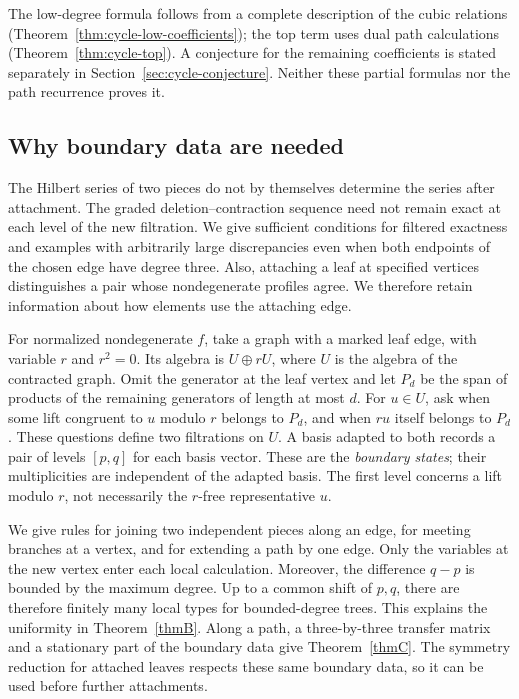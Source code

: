 \documentclass[reqno]{article}
\theoremstyle{plain} %
\theoremstyle{definition}
\theoremstyle{remark}
\numberwithin{equation}{section}
\begin{document}
The low-degree formula follows from a complete description of the cubic
relations (Theorem~\ref{thm:cycle-low-coefficients}); the top term uses
dual path calculations (Theorem~\ref{thm:cycle-top}). A conjecture for
the remaining coefficients is stated separately in
Section~\ref{sec:cycle-conjecture}. Neither these partial formulas nor
the path recurrence proves it.

\subsection{Why boundary data are needed}

The Hilbert series of two pieces do not by themselves determine the
series after attachment. The graded deletion--contraction sequence need
not remain exact at each level of the new filtration. We give sufficient
conditions for filtered exactness and examples with arbitrarily large
discrepancies even when both endpoints of the chosen edge have degree
three. Also, attaching a leaf at specified vertices distinguishes a pair
whose nondegenerate profiles agree. We therefore retain information about
how elements use the attaching edge.

For normalized nondegenerate $f$, take a graph with a marked leaf edge,
with variable $r$ and $r^2=0$.
Its algebra is $U\oplus rU$, where $U$ is the algebra of the contracted
graph. Omit the generator at the leaf vertex and let $P_d$ be the span
of products of the remaining generators of length at most $d$. For
$u\in U$, ask when some lift congruent to $u$ modulo $r$ belongs to
$P_d$, and when $ru$ itself belongs to $P_d$. These questions define
two filtrations on $U$. A basis adapted to both records a pair of levels
$[p,q]$ for each basis vector. These are the \emph{boundary states};
their multiplicities are independent of the adapted basis. The first
level concerns a lift modulo $r$, not necessarily the $r$-free
representative $u$.

We give rules for joining two independent pieces along an edge, for
meeting branches at a vertex, and for extending a path by one edge.
Only the variables at the new vertex enter each local calculation.
Moreover, the difference $q-p$ is bounded by the maximum degree.
Up to a common shift of $p,q$, there are therefore finitely many local
types for bounded-degree trees. This explains the uniformity in
Theorem~\ref{thmB}. Along a path, a three-by-three transfer matrix and
a stationary part of the boundary data give Theorem~\ref{thmC}. The
symmetry reduction for attached leaves respects these same boundary data,
so it can be used before further attachments.
\end{document}
